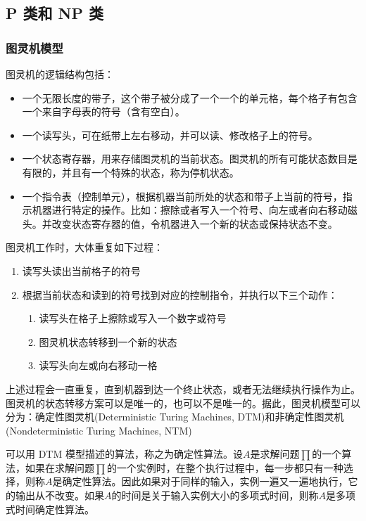 \documentclass[./../main.tex]{subfiles}
\begin{document}
\subsection{P 类和 NP 类}
\subsubsection{图灵机模型}
图灵机的逻辑结构包括：

\begin{itemize}
\item 一个无限长度的带子，这个带子被分成了一个一个的单元格，每个格子有包含一个来自字母表的符号（含有空白）。
\item 一个读写头，可在纸带上左右移动，并可以读、修改格子上的符号。
\item 一个状态寄存器，用来存储图灵机的当前状态。图灵机的所有可能状态数目是有限的，并且有一个特殊的状态，称为停机状态。
\item 一个指令表（控制单元），根据机器当前所处的状态和带子上当前的符号，指示机器进行特定的操作。比如：擦除或者写入一个符号、向左或者向右移动磁头。并改变状态寄存器的值，令机器进入一个新的状态或保持状态不变。
\end{itemize}

图灵机工作时，大体重复如下过程：
\begin{enumerate}
\item 读写头读出当前格子的符号
\item 根据当前状态和读到的符号找到对应的控制指令，并执行以下三个动作：
\begin{enumerate}
\item 读写头在格子上擦除或写入一个数字或符号
\item 图灵机状态转移到一个新的状态
\item 读写头向左或向右移动一格
\end{enumerate}
\end{enumerate}

上述过程会一直重复，直到机器到达一个终止状态，或者无法继续执行操作为止。图灵机的状态转移方案可以是唯一的，也可以不是唯一的。据此，图灵机模型可以分为：确定性图灵机(Deterministic Turing Machines, DTM)和非确定性图灵机(Nondeterministic Turing Machines, NTM)

可以用 DTM 模型描述的算法，称之为确定性算法。设$A$是求解问题$\prod$的一个算法，如果在求解问题$\prod$的一个实例时，在整个执行过程中，每一步都只有一种选择，则称$A$是确定性算法。因此如果对于同样的输入，实例一遍又一遍地执行，它的输出从不改变。如果$A$的时间是关于输入实例大小的多项式时间，则称$A$是多项式时间确定性算法。
\end{document}
